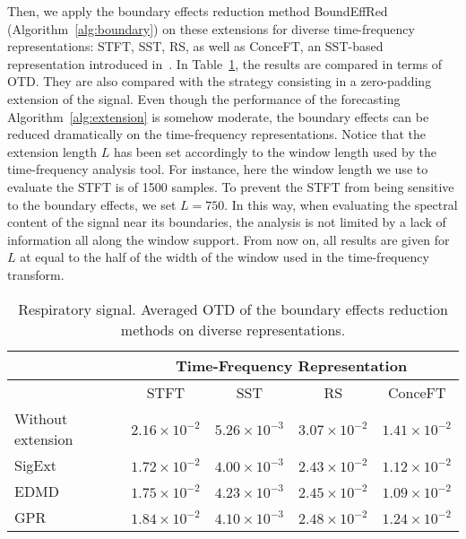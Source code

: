 Then, we apply the boundary effects reduction method {\sf BoundEffRed} (Algorithm~\ref{alg:boundary}) on these extensions for diverse time-frequency representations: STFT, SST, RS, as well as ConceFT, an SST-based representation introduced in~\cite{Daubechies16conceft}. In Table~\ref{tab:otd.tho}, the results are compared in terms of OTD. They are also compared with the strategy consisting in a zero-padding extension of the signal. Even though the performance of the forecasting Algorithm~\ref{alg:extension} is somehow moderate, the boundary effects can be reduced dramatically on the time-frequency representations. Notice that the extension length $L$ has been set accordingly to the window length used by the time-frequency analysis tool. For instance, here the window length we use to evaluate the STFT is of 1500 samples. To prevent the STFT from being sensitive to the boundary effects, we set $L=750$. In this way, when evaluating the spectral content of the signal near its boundaries, the analysis is not limited by a lack of information all along the window support. From now on, all results are given for $L$ at equal to the half of the width of the window used in the time-frequency transform.  

\begin{table}
\centering
\caption{Respiratory signal. Averaged OTD of the boundary effects reduction methods on diverse representations.}
\begin{tabular}{|>{\centering}m{35pt}||c|c|c|c|}
  \hline
   \multirow{2}{35pt}{\centering Extension method} & \multicolumn{4}{c|}{Time-Frequency Representation} \\
   \cline{2-5}
      & STFT & SST & RS & ConceFT \\
   \hhline{|=#=|=|=|=|}
   Without extension & $2.16\!\times\! 10^{-2}$ & $5.26\!\times\! 10^{-3}$ & $3.07\!\times\! 10^{-2}$ & $1.41\!\times\! 10^{-2}$ \\
   \hline
   {\sf SigExt} & $1.72\!\times\! 10^{-2}$ & $4.00\!\times\! 10^{-3}$ & $2.43\!\times\! 10^{-2}$ & $1.12\!\times\! 10^{-2}$ \\
   \hline
   EDMD & $1.75\!\times\! 10^{-2}$ & $4.23\!\times\! 10^{-3}$ & $2.45\!\times\! 10^{-2}$ & $1.09\!\times\! 10^{-2}$ \\
   \hline
   GPR & $1.84\!\times\! 10^{-2}$ & $4.10\!\times\! 10^{-3}$ & $2.48\!\times\! 10^{-2}$ & $1.24\!\times\! 10^{-2}$ \\
   \hline
\end{tabular}
\label{tab:otd.tho}
\end{table}


